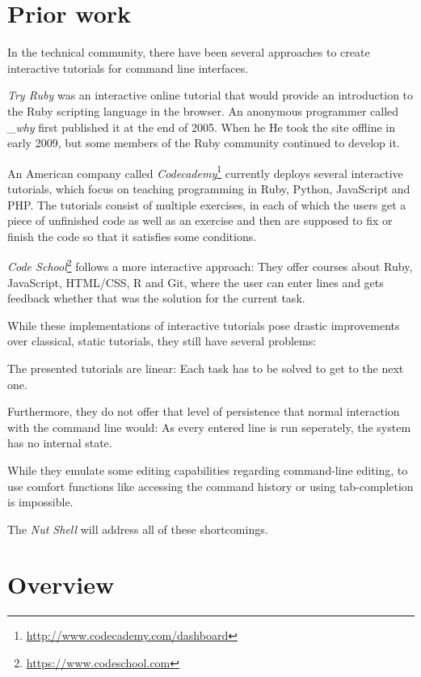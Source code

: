 \documentclass[paper=a4,twoside,abstract=on,cleardoublepage=empty,numbers=noenddot,toc=bib,12pt,appendixprefix=true]{scrreprt}
\begin{document}
\section{Prior work}

In the technical community, there have been several approaches to create interactive tutorials for command line interfaces.

\emph{Try Ruby} was an interactive online tutorial that would provide an introduction to the Ruby scripting language in the browser. An anonymous programmer called \emph{\_why} first published it at the end of 2005.\cite{tryrubydone} When he He took the site offline in early 2009, but some members of the Ruby community continued to develop it.

An American company called \emph{Codecademy}\footnote{\url{http://www.codecademy.com/dashboard}} currently deploys several interactive tutorials, which focus on teaching programming in Ruby, Python, JavaScript and PHP. The tutorials consist of multiple exercises, in each of which the users get a piece of unfinished code as well as an exercise and then are supposed to fix or finish the code so that it satisfies some conditions.

\emph{Code School}\footnote{\url{https://www.codeschool.com}} follows a more interactive approach: They offer courses about Ruby, JavaScript, HTML/CSS, R and Git, where the user can enter lines and gets feedback whether that was the solution for the current task.

While these implementations of interactive tutorials pose drastic improvements over classical, static tutorials, they still have several problems:

The presented tutorials are linear: Each task has to be solved to get to the next one.

Furthermore, they do not offer that level of persistence that normal interaction with the command line would: As every entered line is run seperately, the system has no internal state.

While they emulate some editing capabilities regarding command-line editing, to use comfort functions like accessing the command history or using tab-completion is impossible.

The \emph{Nut Shell} will address all of these shortcomings.

\section{Overview}
\end{document}
